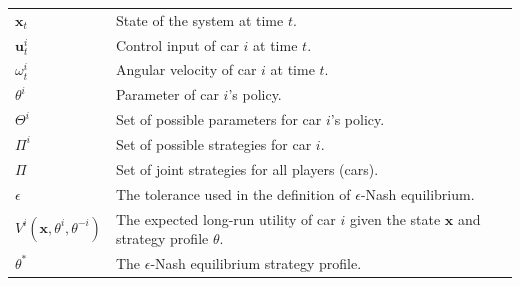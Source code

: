 \begin{longtable}{|l|l|}
\(\mathbf{x}_t\) & State of the system at time \(t\). \\
\(\textbf{u}_t^i\) & Control input of car \(i\) at time \(t\). \\
\(\omega_t^i\) & Angular velocity of car \(i\) at time \(t\). \\
\(\theta^i\) & Parameter of car \(i\)'s policy. \\
\(\Theta^i\) & Set of possible parameters for car \(i\)'s policy. \\
\(\Pi^i\) & Set of possible strategies for car \(i\). \\
\(\Pi\) & Set of joint strategies for all players (cars). \\
\(\epsilon\) & The tolerance used in the definition of \(\epsilon\)-Nash equilibrium. \\
\(V^i(\mathbf{x}, \theta^i, \theta^{-i})\) & The expected long-run utility of car \(i\) given the state \(\mathbf{x}\) and strategy profile \(\theta\). \\
\(\theta^\ast\) & The \(\epsilon\)-Nash equilibrium strategy profile. \\
\end{longtable}